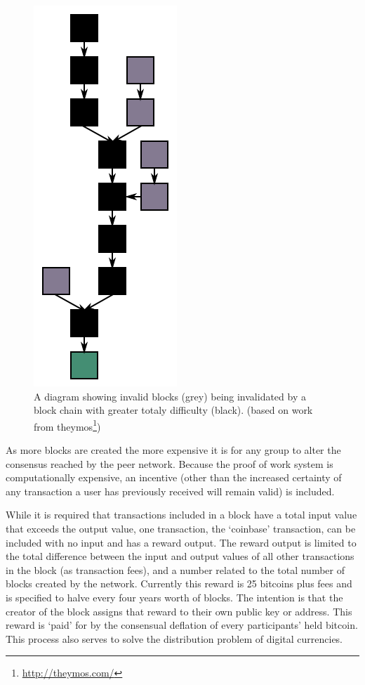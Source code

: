 \begin{figure}[t!]
    \centering
    \includegraphics[height=\columnwidth]{img/Blockchain}
    \caption{A diagram showing invalid blocks (grey) being invalidated by a block chain with greater totaly difficulty (black). (based on work from theymos\protect\footnote{\url{http://theymos.com/}})}
    \label{fig:blockchain}
\end{figure}

As more blocks are created the more expensive it is for any group to alter the consensus reached by the peer network.  Because the proof of work system is computationally expensive, an incentive (other than the increased certainty of any transaction a user has previously received will remain valid) is included.  

While it is required that transactions included in a block have a total input value that exceeds the output value, one transaction, the `coinbase' transaction, can be included with no input and has a reward output.  The reward output is limited to the total difference between the input and output values of all other transactions in the block (as transaction fees), and a number related to the total number of blocks created by the network. Currently this reward is 25 bitcoins plus fees and is specified to halve every four years worth of blocks.  The intention is that the creator of the block assigns that reward to their own public key or address. This reward is `paid' for by the consensual deflation of every participants' held bitcoin. This process also serves to solve the distribution problem of digital currencies.

